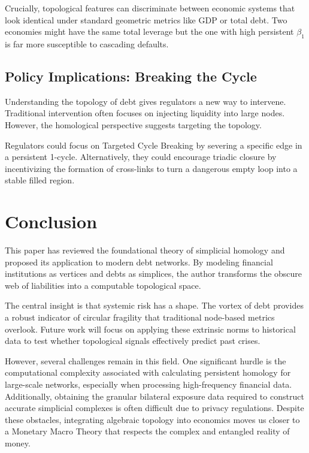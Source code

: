 \documentclass[12pt,reqno]{amsart}
\theoremstyle{definition}
\numberwithin{equation}{section}
\begin{document}
   Crucially, topological features can discriminate between economic systems that look identical under standard geometric metrics like GDP or total debt. Two economies might have the same total leverage but the one with high persistent $\beta_1$ is far more susceptible to cascading defaults.

   \subsection{Policy Implications: Breaking the Cycle}
   Understanding the topology of debt gives regulators a new way to intervene. Traditional intervention often focuses on injecting liquidity into large nodes. However, the homological perspective suggests targeting the topology.

   Regulators could focus on Targeted Cycle Breaking by severing a specific edge in a persistent 1-cycle. Alternatively, they could encourage triadic closure by incentivizing the formation of cross-links to turn a dangerous empty loop into a stable filled region.

   \section{Conclusion}
   This paper has reviewed the foundational theory of simplicial homology and proposed its application to modern debt networks. By modeling financial institutions as vertices and debts as simplices, the author transforms the obscure web of liabilities into a computable topological space.

   The central insight is that systemic risk has a shape. The vortex of debt provides a robust indicator of circular fragility that traditional node-based metrics overlook. Future work will focus on applying these extrinsic norms to historical data to test whether topological signals effectively predict past crises. 
   
   However, several challenges remain in this field. One significant hurdle is the computational complexity associated with calculating persistent homology for large-scale networks, especially when processing high-frequency financial data. Additionally, obtaining the granular bilateral exposure data required to construct accurate simplicial complexes is often difficult due to privacy regulations. Despite these obstacles, integrating algebraic topology into economics moves us closer to a Monetary Macro Theory that respects the complex and entangled reality of money.
\end{document}
